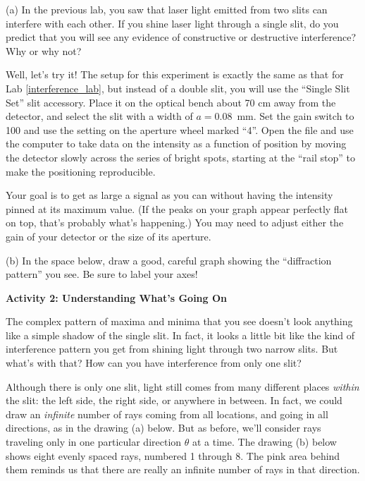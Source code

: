 (a) In the previous lab, you saw that laser light emitted from two slits can interfere with each other.  If you shine laser light through a single slit, do you predict that you will see any evidence of constructive or destructive interference?  Why or why not?
\answerspace{0.8in}


Well, let's try it!  The setup for this experiment is exactly the same as that for Lab \ref{interference_lab},  but instead of a double slit, you will use the ``Single Slit Set'' slit accessory.  Place it on the optical bench about 70 cm away from the detector, and select the slit with a width of $a = 0.08$~mm.   Set the gain switch to 100 and use the setting on the aperture wheel marked ``4''.   Open the file  and use the computer to take data on the intensity as a function of position by moving the detector slowly across the series of bright spots, starting at the ``rail stop'' to make the positioning reproducible.  

Your goal is to get as large a signal as you can without having the intensity pinned at its maximum value.  (If the peaks on your graph appear perfectly flat on top, that's probably what's happening.) You may need to adjust either the gain of your detector or the size of its aperture.

(b) In the space below, draw a good, careful graph showing the ``diffraction pattern'' you see.  
Be sure to label your axes!
\answerspace{1.5in}

\pagebreak[2]
\textbf{Activity 2: Understanding What's Going On}

The complex pattern of maxima and minima that you see doesn't look anything like a simple shadow of the single slit.  In fact, it looks a little bit like the kind of interference pattern you get from shining light through two narrow slits.  But what's with that?  How can you have interference from only one slit?

Although there is only one slit, light still comes from many different places \textit{within} the slit: the left side, the right side, or anywhere in between.  In fact, we could draw an \textit{infinite} number of rays coming from all locations, and going in all directions, as in the drawing (a) below.  But as before, we'll consider rays traveling only in one particular direction $\theta$ at a time.  The drawing (b) below shows eight evenly spaced rays, numbered 1 through 8.  The pink area behind them reminds us that there are really an infinite number of rays in that direction.

